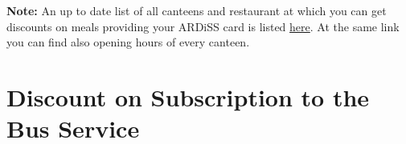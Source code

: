 \documentclass{sissavademecum}
\begin{document}
\textbf{Note:} An up to date list of all canteens and restaurant at which you can get discounts on meals providing your ARDiSS card is listed \href{http://www.ardiss.fvg.it/contenuti.php?view=page&id=214#scheda532}{here}. At the same link you can find also opening hours of every canteen.




\section{Discount on Subscription to the Bus Service}
\end{document}
